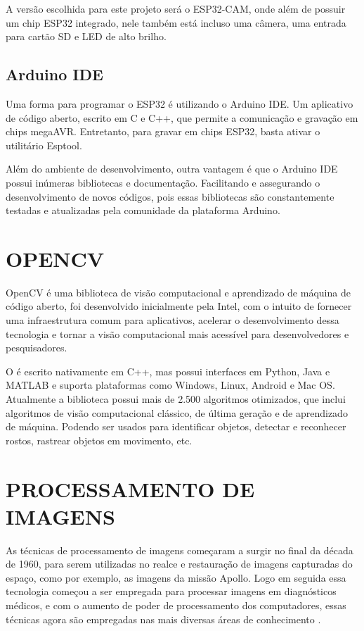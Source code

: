 A versão escolhida para este projeto será o ESP32-CAM, onde além de possuir um 
chip ESP32 integrado, nele também está incluso uma câmera, uma entrada para 
cartão SD e LED de alto brilho.

\subsection{Arduino IDE}\label{sec:espacamento}

Uma forma para programar o ESP32 é utilizando o Arduino IDE. Um aplicativo de 
código aberto, escrito em C e C++, que permite a comunicação e gravação em chips 
megaAVR. Entretanto, para gravar em chips ESP32, basta ativar o utilitário Esptool.

Além do ambiente de desenvolvimento, outra vantagem é que o Arduino IDE 
possui inúmeras bibliotecas e documentação. Facilitando e assegurando o 
desenvolvimento de novos códigos, pois essas bibliotecas são constantemente 
testadas e atualizadas pela comunidade da plataforma Arduino.

\section{OPENCV}\label{sec:formatacaoTexto}

OpenCV é uma biblioteca de visão computacional e aprendizado de 
máquina de código aberto, foi desenvolvido inicialmente pela Intel, com o 
intuito de fornecer uma infraestrutura comum para aplicativos, acelerar o 
desenvolvimento dessa tecnologia e tornar a visão computacional mais acessível 
para desenvolvedores e pesquisadores.

O  é escrito nativamente em C++, mas possui interfaces em 
Python, Java e MATLAB e suporta plataformas como Windows, Linux, Android e 
Mac OS. Atualmente a biblioteca possui mais de 2.500 algoritmos otimizados, 
que inclui algoritmos de visão computacional clássico, de última geração 
e de aprendizado de máquina. Podendo ser usados para identificar objetos,
detectar e reconhecer rostos, rastrear objetos em movimento, etc.

\section{PROCESSAMENTO DE IMAGENS}\label{sec:formatacaoTexto}

As técnicas de processamento de imagens começaram a surgir no final da década de 1960, 
para serem utilizadas no realce e restauração de imagens capturadas do espaço, 
como por exemplo, as imagens da missão Apollo. Logo em seguida essa tecnologia 
começou a ser empregada para processar imagens em diagnósticos médicos, e com 
o aumento de poder de processamento dos computadores, essas técnicas agora 
são empregadas nas mais diversas áreas de conhecimento \cite{gonzalez2010}.

